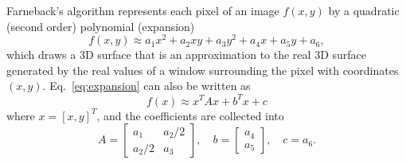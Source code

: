 
\begin{comment}
\begin{figure}
  \centering
  \png{stockholm_hat_P_farneback}{800}
  \caption{The prediction frame (${\hat{\mathbf P}}$). See \href{https://github.com/Sistemas-Multimedia/Sistemas-Multimedia.github.io/blob/master/milestones/09-ME/farneback_ME.ipynb}{this}.}
  \label{fig:hat_P_farneback}
\end{figure}

\begin{figure}
  \centering
  \png{stockholm_error_farneback}{800}
  \caption{The prediction error frame (${\mathbf R} - {\hat{\mathbf P}}$). See \href{https://github.com/Sistemas-Multimedia/Sistemas-Multimedia.github.io/blob/master/milestones/09-ME/farneback_ME.ipynb}{this}.}
  \label{fig:error_farneback}
\end{figure}

\begin{figure}
  \centering
  \png{stockholm_MVs_farneback}{800}
  \caption{Motion vectors to map ${\mathbf P}$ (from which each pixel has been mapped) onto ${\mathbf R}$. See \href{https://github.com/Sistemas-Multimedia/Sistemas-Multimedia.github.io/blob/master/milestones/09-ME/farneback_ME.ipynb}{this}.}
  \label{fig:MVs_farneback}
\end{figure}
\end{comment}


Farneback's algorithm represents each pixel of an image $f(x,y)$ by a quadratic (second order) polynomial (expansion)
\begin{equation}
  f(x,y) \approx a_1x^2 + a_2xy + a_3y^2 + a_4x + a_5y + a_6,
  \label{eq:expansion}
\end{equation}
which draws a 3D surface that is an approximation to the real 3D surface generated by the real values of a window surrounding the pixel with coordinates $(x, y)$. Eq.~\ref{eq:expansion} can also be written as
\begin{equation}
  f(x) \approx x^TAx + b^Tx + c
\end{equation}
where $x = [x,y]^T$, and the coefficients are collected into
\begin{equation}
  A = \begin{bmatrix}
    a_1 & a_2/2 \\
    a_2/2 & a_3
  \end{bmatrix},\quad b=\begin{bmatrix}
    a_4 \\
    a_5
  \end{bmatrix}, \quad c=a_6.
\end{equation}

